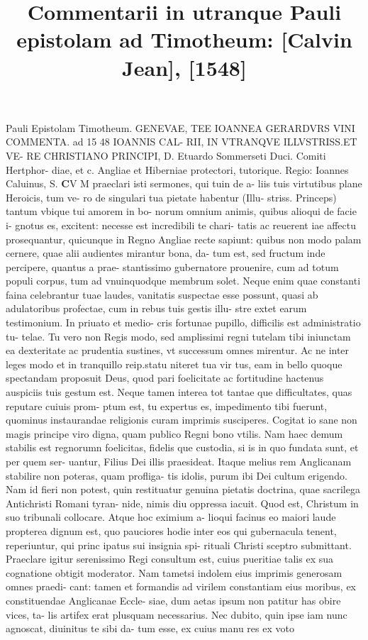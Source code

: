 \documentclass{article}
\begin{document}
\date{}
        \title{Commentarii in utranque Pauli epistolam ad Timotheum: [Calvin Jean], [1548]}
\maketitle
\tableofcontents
\clearpage
\begin{pages} 
\beginnumbering
        Pauli Epistolam Timotheum. GENEVAE, TEE IOANNEA GERARDVRS VINI COMMENTA. ad 15 48 IOANNIS CAL- RII, IN VTRANQVE ILLVSTRISS.ET VE- RE CHRISTIANO PRINCIPI, D. Etuardo Sommerseti Duci. Comiti Hertphor- diae, et c. Angliae et Hiberniae protectori, tutorique. Regio: Ioannes Caluinus, S. \pstart \huge\textbf{C}\normalsize V M praeclari isti sermones, qui tuin de a- liis tuis virtutibus plane Heroicis, tum ve- ro de singulari tua pietate habentur (Illu- striss. Princeps) tantum vbique tui amorem in bo- norum omnium animis, quibus alioqui de facie i- gnotus es, excitent: necesse est incredibili te chari- tatis ac reuerent iae affectu prosequantur, quicunque in Regno Angliae recte sapiunt: quibus non modo palam cernere, quae alii audientes mirantur bona, da- tum est, sed fructum inde percipere, quantus a prae- stantissimo gubernatore prouenire, cum ad totum populi corpus, tum ad vnuinquodque membrum solet. Neque enim quae constanti faina celebrantur tuae laudes, vanitatis suspectae esse possunt, quasi ab adulatoribus profectae, cum in rebus tuis gestis illu- stre extet earum testimonium. In priuato et medio- cris fortunae pupillo, difficilis est administratio tu- telae. Tu vero non Regis modo, sed amplissimi regni tutelam tibi iniunctam ea dexteritate ac prudentia sustines, vt successum omnes mirentur. Ac ne inter leges modo et in tranquillo reip.statu niteret tua vir  \pend\pstart tus, eam in bello quoque spectandam proposuit Deus, quod pari foelicitate ac fortitudine hactenus auspiciis tuis gestum est. Neque tamen interea tot tantae que difficultates, quas reputare cuiuis prom- ptum est, tu expertus es, impedimento tibi fuerunt, quominus instaurandae religionis curam imprimis susciperes. Cogitat io sane non magis principe viro digna, quam publico Regni bono vtilis. Nam haec demum stabilis est regnorumn foelicitas, fidelis que custodia, si is in quo fundata sunt, et per quem ser- uantur, Filius Dei illis praesideat. Itaque melius rem Anglicanam stabilire non poteras, quam profliga- tis idolis, purum ibi Dei cultum erigendo. Nam id fieri non potest, quin restituatur genuina pietatis doctrina, quae sacrilega Antichristi Romani tyran- nide, nimis diu oppressa iacuit. Quod est, Christum in suo tribunali collocare. Atque hoc eximium a- lioqui facinus eo maiori laude propterea dignum est, quo pauciores hodie inter eos qui gubernacula tenent, reperiuntur, qui princ ipatus sui insignia spi- rituali Christi sceptro submittant. Praeclare igitur serenissimo Regi consultum est, cuius pueritiae talis ex sua cognatione obtigit moderator. Nam tametsi indolem eius imprimis generosam omnes praedi- cant: tamen et formandis ad virilem constantiam eius moribus, ex constituendae Anglicanae Eccle- siae, dum aetas ipsum non patitur has obire vices, ta-  \pend\pstart lis artifex erat plusquam necessarius. Nec dubito, quin ipse iam nunc agnoscat, diuinitus te sibi da- tum esse, ex cuius manu res ex voto 
\end{pages}
\end{document}
